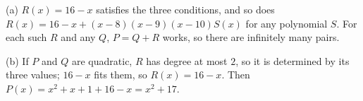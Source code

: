 (a) $R(x)=16-x$ satisfies the three conditions, and so does $R(x)=16-x+(x-8)(x-9)(x-10)S(x)$ for any polynomial $S$. For each such $R$ and any $Q$, $P=Q+R$ works, so there are infinitely many pairs.

(b) If $P$ and $Q$ are quadratic, $R$ has degree at most $2$, so it is determined by its three values; $16-x$ fits them, so $R(x)=16-x$. Then $P(x)=x^2+x+1+16-x=\boxed{x^2+17}$.
